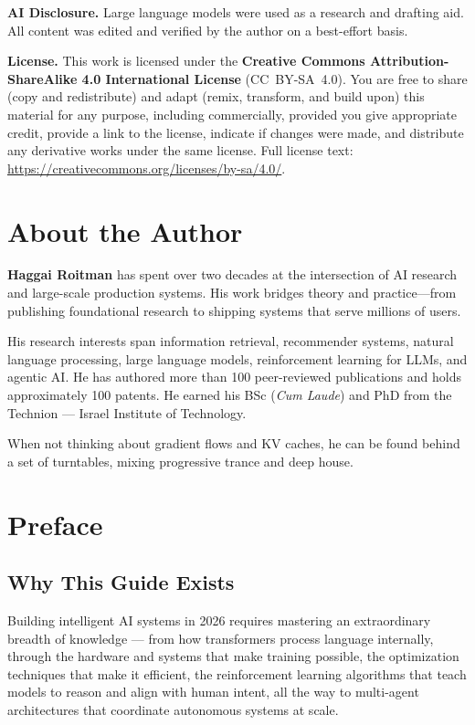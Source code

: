 \documentclass[11pt,a4paper,openany]{book}
\begin{document}
\textbf{AI Disclosure.} Large language models were used as a research and drafting aid. All content was edited and verified by the author on a best-effort basis.

\textbf{License.} This work is licensed under the \textbf{Creative Commons Attribution-ShareAlike 4.0 International License} (CC~BY-SA~4.0). You are free to share (copy and redistribute) and adapt (remix, transform, and build upon) this material for any purpose, including commercially, provided you give appropriate credit, provide a link to the license, indicate if changes were made, and distribute any derivative works under the same license. Full license text: \href{https://creativecommons.org/licenses/by-sa/4.0/}{https://creativecommons.org/licenses/by-sa/4.0/}.

\chapter*{About the Author}
\label{about-the-author}

\textbf{Haggai Roitman} has spent over two decades at the intersection of AI research and large-scale production systems. His work bridges theory and practice---from publishing foundational research to shipping systems that serve millions of users.

His research interests span information retrieval, recommender systems, natural language processing, large language models, reinforcement learning for LLMs, and agentic AI. He has authored more than 100 peer-reviewed publications and holds approximately 100 patents. He earned his BSc (\emph{Cum Laude}) and PhD from the Technion --- Israel Institute of Technology.

When not thinking about gradient flows and KV caches, he can be found behind a set of turntables, mixing progressive trance and deep house.

\chapter*{Preface}
\label{preface}

\section*{Why This Guide Exists}
\label{why-this-guide-exists}

Building intelligent AI systems in 2026 requires mastering an extraordinary breadth of knowledge --- from how transformers process language internally, through the hardware and systems that make training possible, the optimization techniques that make it efficient, the reinforcement learning algorithms that teach models to reason and align with human intent, all the way to multi-agent architectures that coordinate autonomous systems at scale.
\end{document}
